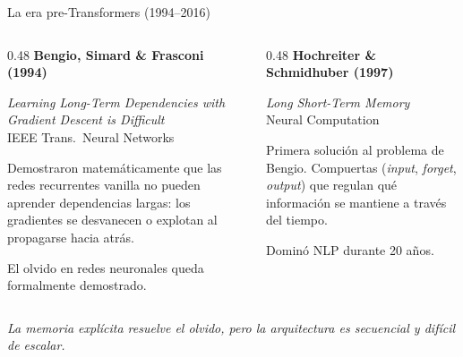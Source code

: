 \documentclass[aspectratio=169, 11pt]{beamer}
\begin{document}

\begin{frame}{La era pre-Transformers (1994--2016)}

\begin{columns}[T]
\begin{column}{0.48\textwidth}
\textbf{Bengio, Simard \& Frasconi (1994)}

\vspace{0.2em}
\textit{\scriptsize Learning Long-Term Dependencies with Gradient Descent is Difficult} \\ {\scriptsize IEEE Trans.\ Neural Networks}

\vspace{0.4em}
\footnotesize
Demostraron matem\'aticamente que las redes recurrentes vanilla \alert{no pueden} aprender dependencias largas: los gradientes se desvanecen o explotan al propagarse hacia atr\'as.

\vspace{0.4em}
El olvido en redes neuronales queda formalmente demostrado.
\end{column}

\begin{column}{0.48\textwidth}
\textbf{Hochreiter \& Schmidhuber (1997)}

\vspace{0.2em}
\textit{\scriptsize Long Short-Term Memory} \\ {\scriptsize Neural Computation}

\vspace{0.4em}
\footnotesize
Primera soluci\'on al problema de Bengio. Compuertas (\emph{input}, \emph{forget}, \emph{output}) que regulan qu\'e informaci\'on se mantiene a trav\'es del tiempo.

\vspace{0.4em}
Domin\'o NLP durante 20 a\~nos.
\end{column}
\end{columns}

\vspace{1.5em}

\begin{center}
\footnotesize
\emph{La memoria expl\'icita resuelve el olvido, pero la arquitectura es secuencial y dif\'icil de escalar.}
\end{center}

\end{frame}
\end{document}
